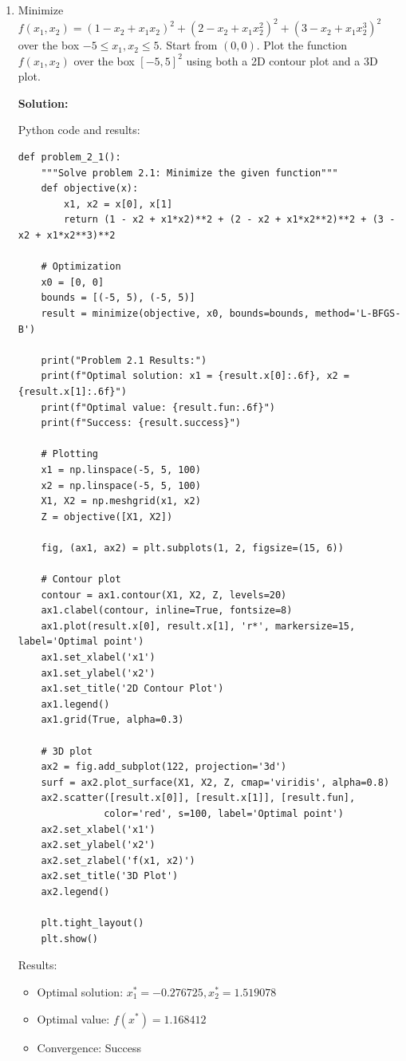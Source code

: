 \documentclass{article}
\begin{document}
\begin{enumerate}


\item Minimize $f(x_1, x_2)=(1-x_2+x_1x_2)^2+(2-x_2+x_1x_2^2)^2+(3-x_2+x_1x_2^3)^2$ over the box $-5\le x_1, x_2 \le 5$. Start from $(0,0)$. Plot the function $f(x_1,x_2)$ over the box $[-5,5]^2$ using both a 2D contour plot and a 3D plot.

\textbf{Solution:}

Python code and results:

\begin{verbatim}
def problem_2_1():
    """Solve problem 2.1: Minimize the given function"""
    def objective(x):
        x1, x2 = x[0], x[1]
        return (1 - x2 + x1*x2)**2 + (2 - x2 + x1*x2**2)**2 + (3 - x2 + x1*x2**3)**2
    
    # Optimization
    x0 = [0, 0]
    bounds = [(-5, 5), (-5, 5)]
    result = minimize(objective, x0, bounds=bounds, method='L-BFGS-B')
    
    print("Problem 2.1 Results:")
    print(f"Optimal solution: x1 = {result.x[0]:.6f}, x2 = {result.x[1]:.6f}")
    print(f"Optimal value: {result.fun:.6f}")
    print(f"Success: {result.success}")
    
    # Plotting
    x1 = np.linspace(-5, 5, 100)
    x2 = np.linspace(-5, 5, 100)
    X1, X2 = np.meshgrid(x1, x2)
    Z = objective([X1, X2])
    
    fig, (ax1, ax2) = plt.subplots(1, 2, figsize=(15, 6))
    
    # Contour plot
    contour = ax1.contour(X1, X2, Z, levels=20)
    ax1.clabel(contour, inline=True, fontsize=8)
    ax1.plot(result.x[0], result.x[1], 'r*', markersize=15, label='Optimal point')
    ax1.set_xlabel('x1')
    ax1.set_ylabel('x2')
    ax1.set_title('2D Contour Plot')
    ax1.legend()
    ax1.grid(True, alpha=0.3)
    
    # 3D plot
    ax2 = fig.add_subplot(122, projection='3d')
    surf = ax2.plot_surface(X1, X2, Z, cmap='viridis', alpha=0.8)
    ax2.scatter([result.x[0]], [result.x[1]], [result.fun], 
               color='red', s=100, label='Optimal point')
    ax2.set_xlabel('x1')
    ax2.set_ylabel('x2')
    ax2.set_zlabel('f(x1, x2)')
    ax2.set_title('3D Plot')
    ax2.legend()
    
    plt.tight_layout()
    plt.show()
\end{verbatim}

Results:
\begin{itemize}
\item Optimal solution: $x_1^* = -0.276725, x_2^* = 1.519078$
\item Optimal value: $f(x^*) = 1.168412$
\item Convergence: Success
\end{itemize}


\end{enumerate}
\end{document}
